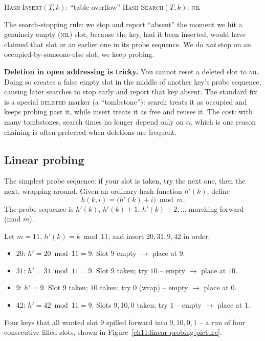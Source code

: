 \begin{algorithm}[H]
\caption{Open-addressing Insert and Search}
\textsc{Hash-Insert}$(T,k)$:\;
\Return ``table overflow''\;
\BlankLine
\textsc{Hash-Search}$(T,k)$:\;
\Return \textsc{nil}\;
\end{algorithm}

The search-stopping rule: we stop and report ``absent'' the moment we hit a genuinely empty (\textsc{nil}) slot, because the key, had it been inserted, would have claimed that slot or an earlier one in its probe sequence. We do \emph{not} stop on an occupied-by-someone-else slot; we keep probing.

\begin{trapbox}
\textbf{Deletion in open addressing is tricky.} You cannot reset a deleted slot to \textsc{nil}. Doing so creates a false empty slot in the middle of another key's probe sequence, causing later searches to stop early and report that key absent. The standard fix is a special \textsc{deleted} marker (a ``tombstone''): search treats it as occupied and keeps probing past it, while insert treats it as free and reuses it. The cost: with many tombstones, search times no longer depend only on $\alpha$, which is one reason chaining is often preferred when deletions are frequent.
\end{trapbox}

\subsection{Linear probing}

The simplest probe sequence: if your slot is taken, try the next one, then the next, wrapping around. Given an ordinary hash function $h'(k)$, define
\[
  h(k,i) = \big(h'(k) + i\big) \bmod m.
\]
The probe sequence is $h'(k),\, h'(k)+1,\, h'(k)+2, \dots$ marching forward (mod $m$).

\begin{example}
Let $m = 11$, $h'(k) = k \bmod 11$, and insert $20, 31, 9, 42$ in order.
\begin{itemize}
  \item $20$: $h'=20\bmod 11=9$. Slot $9$ empty $\to$ place at $9$.
  \item $31$: $h'=31\bmod 11=9$. Slot $9$ taken; try $10$ -- empty $\to$ place at $10$.
  \item $9$: $h'=9$. Slot $9$ taken; $10$ taken; try $0$ (wrap) -- empty $\to$ place at $0$.
  \item $42$: $h'=42\bmod 11=9$. Slots $9,10,0$ taken; try $1$ -- empty $\to$ place at $1$.
\end{itemize}
Four keys that all wanted slot $9$ spilled forward into $9,10,0,1$ -- a run of four consecutive filled slots, shown in Figure~\ref{ch11:linear-probing-picture}.
\end{example}

